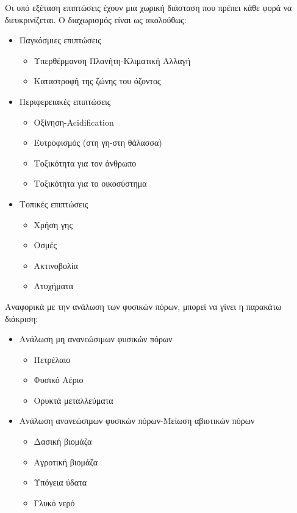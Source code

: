 \documentclass[12pt]{article}
\newcommand{\gr}{\selectlanguage{greek}}
\newcommand{\eng}{\selectlanguage{english}}
\begin{document}
 	Οι υπό εξέταση επιπτώσεις έχουν μια χωρική διάσταση που πρέπει κάθε φορά να διευκρινίζεται. Ο διαχωρισμός είναι ως ακολούθως:
 	\begin{itemize}
 		\item Παγκόσμιες επιπτώσεις
 		\begin{itemize}
 			\item Υπερθέρμανση Πλανήτη-Κλιματική Αλλαγή
 			\item Καταστροφή της ζώνης του όζοντος
 		\end{itemize}
 		\item Περιφερειακές επιπτώσεις
 		\begin{itemize}
 			\item Οξίνηση-\eng Acidification \gr
 			\item Ευτροφισμός (στη γη-στη θάλασσα)
 			\item Τοξικότητα για τον άνθρωπο
 			\item Τοξικότητα για το οικοσύστημα
 		\end{itemize}
 		\item Τοπικές επιπτώσεις
 		\begin{itemize}
 			\item Χρήση γης
 			\item Οσμές
 			\item Ακτινοβολία
 			\item Ατυχήματα
		\end{itemize}
 	\end{itemize}
 
 	Αναφορικά με την ανάλωση των φυσικών πόρων, μπορεί να γίνει η παρακάτω διάκριση:
 	
 	\begin{itemize}
 		\item Ανάλωση μη ανανεώσιμων φυσικών πόρων
 		\begin{itemize}
	 		\item Πετρέλαιο
	 		\item Φυσικό Αέριο
 			\item Ορυκτά μεταλλεύματα
		\end{itemize}
		\item Ανάλωση ανανεώσιμων φυσικών πόρων-Μείωση αβιοτικών πόρων
		\begin{itemize}
			\item Δασική βιομάζα
			\item Αγροτική βιομάζα
			\item Υπόγεια ύδατα
			\item Γλυκό νερό
		\end{itemize}
 	\end{itemize}
 
\end{document}
